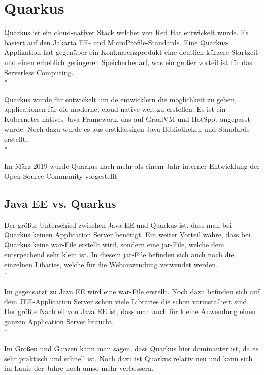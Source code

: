 \cite{JavaEE}

\section{Quarkus}
\author{David Ignjatovic} 

Quarkus ist ein cloud-nativer Stack welcher von Red Hat entwickelt wurde. Es basiert auf den Jakarta EE- und MicroProfile-Standards. 
Eine Quarkus-Applikation hat gegenüber ein Konkurrenzprodukt eine deutlich kürzere Startzeit und einen erheblich geringeren Speicherbedarf, was ein großer vorteil ist für das Serverless Computing.  \cite{Quarkus} \\*

Quarkus wurde für entwickelt um de entwicklern die möglichkeit zu geben, applicationen für die moderne, cloud-native welt zu erstellen. 
Es ist ein Kubernetes-natives Java-Framework, das auf GraalVM und HotSpot angepasst wurde. Noch dazu wurde es aus erstklassigen Java-Bibliotheken und Standards erstellt. \\*   

Im März 2019 wurde Quarkus nach mehr als einem Jahr interner Entwicklung der Open-Source-Community vorgestellt

\subsection{Java EE vs. Quarkus}
\author{David Ignjatovic} 

Der größte Unterschied zwischen Java EE und Quarkus ist, dass man bei Quarkus keinen Application Server benötigt. 
Ein weiter Vorteil währe, dass bei Quarkus keine war-File erstellt wird, sondern eine jar-File, welche dem entsrpechend sehr klein ist. 
In diesem jar-File befinden sich auch noch die einzelnen Libaries, welche für die Webanwendung verwendet werden. \\*

Im gegensatzt zu Java EE wird eine war-File erstellt. Noch dazu befinden sich auf dem JEE-Application Server schon viele Libraries die schon vorinstalliert sind. 
Der größte Nachteil von Java EE ist, dass man auch für kleine Anwendung einen ganzen Application Server braucht. \\*

Im Großen und Ganzen kann man sagen, dass Quarkus hier dominanter ist, da es sehr praktisch und schnell ist. Noch dazu ist Quarkus relativ neu und kann sich im Laufe der Jahre noch umso mehr verbessern.




